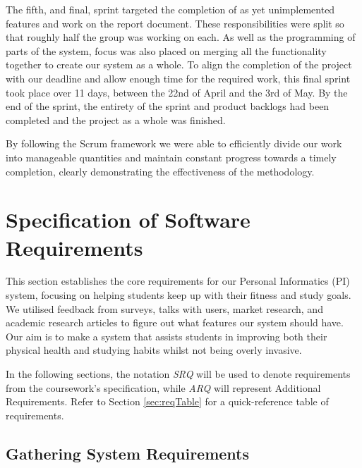 \documentclass[12pt]{article}
\begin{document}
The fifth, and final, sprint targeted the completion of as yet unimplemented
features and work on the report document. These responsibilities were split so
that roughly half the group was working on each. As well as the programming of
parts of the system, focus was also placed on merging all the functionality
together to create our system as a whole. To align the completion of the 
project with our deadline and allow enough time for the required work, this 
final sprint took place over 11 days, between the 22nd of April and the 3rd of 
May. By the end of the sprint, the entirety of the sprint and product 
backlogs had been completed and the project as a whole was finished.\par

By following the Scrum framework we were able to efficiently divide our work 
into manageable quantities and maintain constant progress towards a timely 
completion, clearly demonstrating the effectiveness of the methodology.\par


\newpage
\section{Specification of Software Requirements}

This section establishes the core requirements for our Personal Informatics
(PI) system, focusing on helping students keep up with their fitness and study
goals. We utilised feedback from surveys, talks with users, market research,
and academic research articles to figure out what features our system should have. Our
aim is to make a system that assists students in improving both their physical
health and studying habits whilst not being overly invasive.\par

In the following sections, the notation \textit{SRQ} will be used to denote
requirements from the coursework's specification, while \textit{ARQ} will
represent Additional Requirements. Refer to Section \ref{sec:reqTable} for a
quick-reference table of requirements.

\subsection{Gathering System Requirements}
\end{document}

